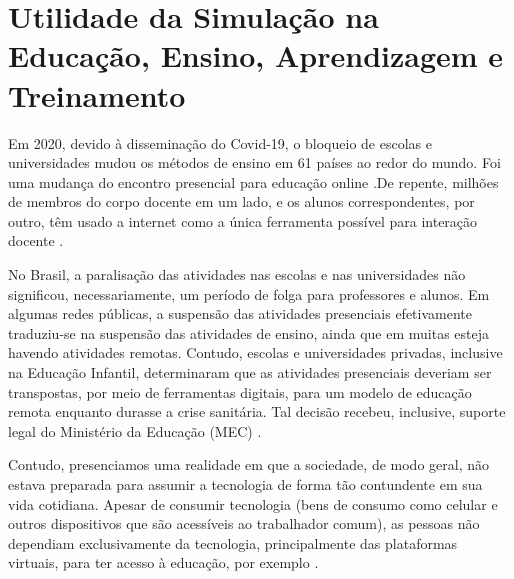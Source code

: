 \section{Utilidade da Simulação na Educação, Ensino, Aprendizagem e Treinamento}


Em 2020, devido à disseminação do Covid-19, o bloqueio de escolas e universidades mudou os métodos de ensino em 61 países ao redor do mundo. Foi uma mudança do encontro presencial para educação online \cite{UNESCO2020:online}.De repente, milhões de membros do corpo docente em um lado, e os alunos correspondentes, por outro, têm usado a internet como a única ferramenta possível para interação docente \cite{BAO2020:online}.

No Brasil, a paralisação das atividades nas escolas e nas universidades não significou, necessariamente, um período de folga para professores e alunos. Em algumas redes públicas, a suspensão das atividades presenciais efetivamente traduziu-se na suspensão das atividades de ensino, ainda que em muitas esteja havendo atividades remotas. Contudo, escolas e universidades privadas, inclusive na Educação Infantil, determinaram que as atividades presenciais deveriam ser transpostas, por meio de ferramentas digitais, para um modelo de educação remota enquanto durasse a crise sanitária. Tal decisão recebeu, inclusive, suporte legal do Ministério da Educação (MEC) \cite{saraiva2020educacao}.

Contudo, presenciamos uma realidade em que a sociedade, de modo geral, não estava preparada para assumir  a  tecnologia  de  forma  tão  contundente  em  sua  vida cotidiana.  Apesar  de  consumir  tecnologia  (bens  de  consumo  como  celular e outros  dispositivos  que  são  acessíveis  ao  trabalhador  comum),  as  pessoas não dependiam exclusivamente da tecnologia, principalmente das plataformas virtuais, para ter acesso à educação, por exemplo \cite{miranda2021formacao}.








